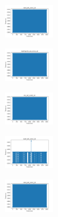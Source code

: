 \begin{figure}[H]
    \begin{subfigure}
        \centering
        \includegraphics[width=0.234\textwidth]{img/agesf/rand_set_const_10_277451237_time.png}
    \end{subfigure}
    \hfill
    \begin{subfigure}
        \centering
        \includegraphics[width=0.234\textwidth]{img/agesf/newthyroid_set_const_10_277451237_time.png}
    \end{subfigure}
    \hfill
    \begin{subfigure}
        \centering
        \includegraphics[width=0.234\textwidth]{img/agesf/iris_set_const_10_49258669_time.png}
    \end{subfigure}
    \hfill
    \begin{subfigure}
        \centering
        \includegraphics[width=0.234\textwidth]{img/agesf/ecoli_set_const_10_49258669_time.png}
    \end{subfigure}
    \hfill
    \begin{subfigure}
        \centering
        \includegraphics[width=0.234\textwidth]{img/agesf/rand_set_const_10_49258669_time.png}
    \end{subfigure}
    \hfill
    \begin{subfigure}
        \centering

\end{subfigure}
\end{figure}
